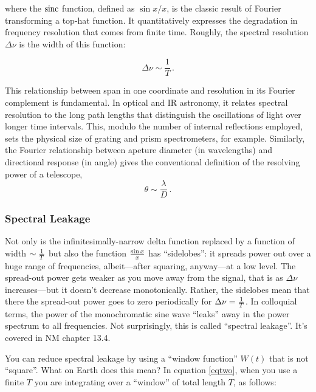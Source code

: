 \documentclass[11pt,preprint]{aastex}
\begin{document}
\noindent where the ${\rm sinc}$ function, defined as $\sin x / x$, is the classic
result of Fourier transforming a top-hat function.
It quantitatively expresses the degradation in frequency
resolution that comes from finite time. Roughly, the spectral
resolution $\Delta\nu$ is the width of this function:

\begin{equation}
\Delta \nu \sim \frac1T\, .
\end{equation}

This relationship between span in one coordinate and 
resolution in its Fourier complement is fundamental.
In optical and IR astronomy, it relates spectral
resolution to the long path lengths that distinguish the oscillations of light
over longer time intervals.
This, modulo the number of internal reflections employed, sets the physical size 
of grating and prism spectrometers, for example.
Similarly, the Fourier relationship between apeture diameter (in wavelengths)
and directional response (in angle)
gives the conventional definition of the resolving power of a telescope,
\begin{equation}
\theta\sim\frac\lambda{D}\, .
\end{equation}

\subsubsection{Spectral Leakage}

\noindent
Not only is the infinitesimally-narrow delta function replaced by
a function of width $\sim {1 \over T}$ but also the function $\sin x
\over x$ has ``sidelobes'': it spreads power out over a huge range of
frequencies, albeit---after squaring, anyway---at a low level.  The
spread-out power gets weaker as you move away from the signal, that is
as $\Delta \nu$ increases---but it doesn't decrease monotonically. 
Rather, the    sidelobes mean that there the spread-out power goes to
zero periodically for $\Delta \nu = {1 \over T}$.  In colloquial terms,
the power of the monochromatic sine wave ``leaks'' away in the power
spectrum to all frequencies.  Not surprisingly, this is called
``spectral leakage''. It's covered in NM chapter 13.4.

        You can reduce spectral leakage by using a ``window function''
$W(t)$ that is not ``square''.  What on Earth does this mean? In equation
\ref{eqtwo}, when you use a finite $T$ you are integrating over a    
``window'' of total length $T$, as follows:
\end{document}
